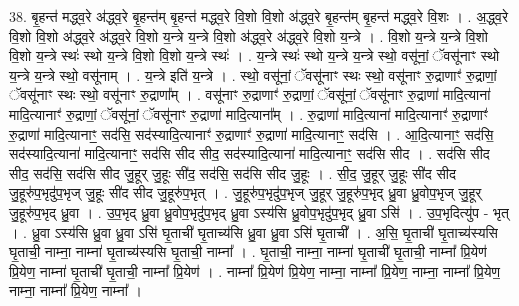 \documentclass[17pt]{extarticle}
\begin{document}
38. बृ॒हन्त॑ मद्ध्व॒रे अ॑द्ध्व॒रे बृ॒हन्त॑म् बृ॒हन्त॑ मद्ध्व॒रे वि॒शो वि॒शो अ॑द्ध्व॒रे बृ॒हन्त॑म् बृ॒हन्त॑ मद्ध्व॒रे वि॒शः । . अ॒द्ध्व॒रे वि॒शो वि॒शो अ॑द्ध्व॒रे अ॑द्ध्व॒रे वि॒शो य॒न्त्रे य॒न्त्रे वि॒शो अ॑द्ध्व॒रे अ॑द्ध्व॒रे वि॒शो य॒न्त्रे । . वि॒शो य॒न्त्रे य॒न्त्रे वि॒शो वि॒शो य॒न्त्रे स्थः॑ स्थो य॒न्त्रे वि॒शो वि॒शो य॒न्त्रे स्थः॑ । . य॒न्त्रे स्थः॑ स्थो य॒न्त्रे य॒न्त्रे स्थो॒ वसू॑नां॒ ॅवसू॑नाꣳ स्थो य॒न्त्रे य॒न्त्रे स्थो॒ वसू॑नाम् । . य॒न्त्रे इति॑ य॒न्त्रे । . स्थो॒ वसू॑नां॒ ॅवसू॑नाꣳ स्थः स्थो॒ वसू॑नाꣳ रु॒द्राणाꣳ॑ रु॒द्राणां॒ ॅवसू॑नाꣳ स्थः स्थो॒ वसू॑नाꣳ रु॒द्राणा᳚म् । . वसू॑नाꣳ रु॒द्राणाꣳ॑ रु॒द्राणां॒ ॅवसू॑नां॒ ॅवसू॑नाꣳ रु॒द्राणा॑ मादि॒त्याना॑ मादि॒त्यानाꣳ॑ रु॒द्राणां॒ ॅवसू॑नां॒ ॅवसू॑नाꣳ रु॒द्राणा॑ मादि॒त्याना᳚म् । . रु॒द्राणा॑ मादि॒त्याना॑ मादि॒त्यानाꣳ॑ रु॒द्राणाꣳ॑ रु॒द्राणा॑ मादि॒त्यानाꣳ॒॒ सद॑सि॒ सद॑स्यादि॒त्यानाꣳ॑ रु॒द्राणाꣳ॑ रु॒द्राणा॑ मादि॒त्यानाꣳ॒॒ सद॑सि । . आ॒दि॒त्यानाꣳ॒॒ सद॑सि॒ सद॑स्यादि॒त्याना॑ मादि॒त्यानाꣳ॒॒ सद॑सि सीद सीद॒ सद॑स्यादि॒त्याना॑ मादि॒त्यानाꣳ॒॒ सद॑सि सीद । . सद॑सि सीद सीद॒ सद॑सि॒ सद॑सि सीद जु॒हूर् जु॒हूः सी॑द॒ सद॑सि॒ सद॑सि सीद जु॒हूः । . सी॒द॒ जु॒हूर् जु॒हूः सी॑द सीद जु॒हूरु॑प॒भृदु॑प॒भृज् जु॒हूः सी॑द सीद जु॒हूरु॑प॒भृत् । . जु॒हूरु॑प॒भृदु॑प॒भृज् जु॒हूर् जु॒हूरु॑प॒भृद् ध्रु॒वा ध्रु॒वोप॒भृज् जु॒हूर् जु॒हूरु॑प॒भृद् ध्रु॒वा । . उ॒प॒भृद् ध्रु॒वा ध्रु॒वोप॒भृदु॑प॒भृद् ध्रु॒वा ऽस्य॑सि ध्रु॒वोप॒भृदु॑प॒भृद् ध्रु॒वा ऽसि॑ । . उ॒प॒भृदित्यु॑प - भृत् । . ध्रु॒वा ऽस्य॑सि ध्रु॒वा ध्रु॒वा ऽसि॑ घृ॒ताची॑ घृ॒ताच्य॑सि ध्रु॒वा ध्रु॒वा ऽसि॑ घृ॒ताची᳚ । . अ॒सि॒ घृ॒ताची॑ घृ॒ताच्य॑स्यसि घृ॒ताची॒ नाम्ना॒ नाम्ना॑ घृ॒ताच्य॑स्यसि घृ॒ताची॒ नाम्ना᳚ । . घृ॒ताची॒ नाम्ना॒ नाम्ना॑ घृ॒ताची॑ घृ॒ताची॒ नाम्ना᳚ प्रि॒येण॑ प्रि॒येण॒ नाम्ना॑ घृ॒ताची॑ घृ॒ताची॒ नाम्ना᳚ प्रि॒येण॑ । . नाम्ना᳚ प्रि॒येण॑ प्रि॒येण॒ नाम्ना॒ नाम्ना᳚ प्रि॒येण॒ नाम्ना॒ नाम्ना᳚ प्रि॒येण॒ नाम्ना॒ नाम्ना᳚ प्रि॒येण॒ नाम्ना᳚ । \newline
\end{document}
